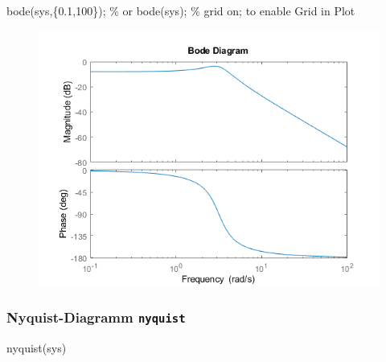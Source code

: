 \documentclass[
  10pt,
  a4paper,
  twocolumn]{article}
\newenvironment{Shaded}{}{}
\newcommand{\CommentTok}[1]{\textcolor[rgb]{0.42,0.45,0.49}{#1}}
\newcommand{\FloatTok}[1]{\textcolor[rgb]{0.00,0.36,0.77}{#1}}
\newcommand{\NormalTok}[1]{\textcolor[rgb]{0.14,0.16,0.18}{#1}}
\newcommand{\OperatorTok}[1]{\textcolor[rgb]{0.14,0.16,0.18}{#1}}
\newcommand{\VariableTok}[1]{\textcolor[rgb]{0.89,0.38,0.04}{#1}}
\numberwithin{equation}{section}
\begin{document}
\begin{Shaded}
\begin{Highlighting}[]
\VariableTok{bode}\NormalTok{(}\VariableTok{sys}\OperatorTok{,}\NormalTok{\{}\FloatTok{0.1}\OperatorTok{,}\FloatTok{100}\NormalTok{\})}\OperatorTok{;} \CommentTok{\% or bode(sys);}
\CommentTok{\% grid on; to enable Grid in Plot}
\end{Highlighting}
\end{Shaded}

\begin{figure}[H]

{\centering \includegraphics{images/matlab_BodePlotResponse.png}

}

\end{figure}

\hypertarget{nyquist-diagramm-nyquist}{%
\subsubsection{\texorpdfstring{Nyquist-Diagramm
\texttt{nyquist}}{Nyquist-Diagramm nyquist}}\label{nyquist-diagramm-nyquist}}

\begin{Shaded}
\begin{Highlighting}[]
\VariableTok{nyquist}\NormalTok{(}\VariableTok{sys}\NormalTok{)}
\end{Highlighting}
\end{Shaded}
\end{document}
